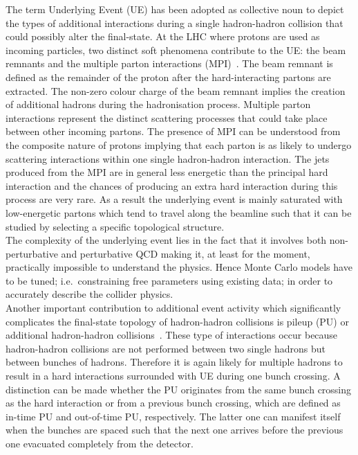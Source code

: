 The term Underlying Event (UE) has been adopted as collective noun to depict the types of additional interactions during a single hadron-hadron collision that could possibly alter the final-state. At the LHC where protons are used as incoming particles, two distinct soft phenomena contribute to the UE: the beam remnants and the multiple parton interactions (MPI)~\cite{}.
The beam remnant is defined as the remainder of the proton after the hard-interacting partons are extracted. The non-zero colour charge of the beam remnant implies the creation of additional hadrons during the hadronisation process.
Multiple parton interactions represent the distinct scattering processes that could take place between other incoming partons. 
The presence of MPI can be understood from the composite nature of protons implying that each parton is as likely to undergo scattering interactions within one single hadron-hadron interaction.
The jets produced from the MPI  are in general less energetic than the principal hard interaction and the chances of producing an extra hard interaction during this process are very rare.
As a result the underlying event is mainly saturated with low-energetic partons which tend to travel along the beamline such that it can be studied by selecting a specific topological structure.
\\
The complexity of the underlying event lies in the fact that it involves both non-perturbative and perturbative QCD making it, at least for the moment, practically impossible to understand the physics. Hence Monte Carlo models have to be tuned; i.e.\ constraining free parameters using existing data; in order to accurately describe the collider physics.
\\

Another important contribution to additional event activity which significantly complicates the final-state topology of hadron-hadron collisions is pileup (PU) or additional hadron-hadron collisions~\cite{}. These type of interactions occur because hadron-hadron collisions are not performed between two single hadrons but between bunches of hadrons. Therefore it is again likely for multiple hadrons to result in a hard interactions surrounded with UE during one bunch crossing. A distinction can be made whether the PU originates from the same bunch crossing as the hard interaction or from a previous bunch crossing, which are defined as in-time PU and out-of-time PU, respectively. The latter one can manifest itself when the bunches are spaced such that the next one arrives before the previous one evacuated completely from the detector.

